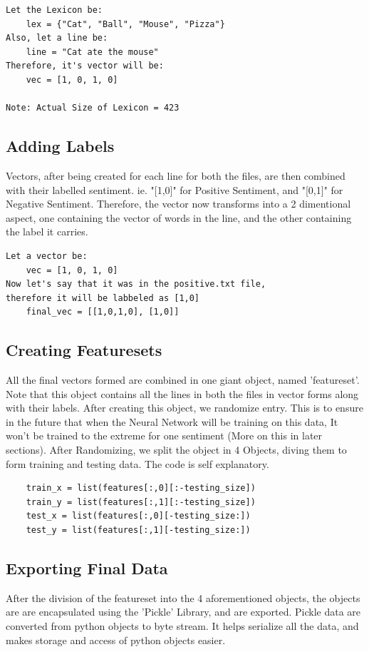 \begin{verbatim}
Let the Lexicon be:
    lex = {"Cat", "Ball", "Mouse", "Pizza"}
Also, let a line be:
    line = "Cat ate the mouse"
Therefore, it's vector will be:
    vec = [1, 0, 1, 0]

Note: Actual Size of Lexicon = 423
\end{verbatim}

\subsection{Adding Labels}
Vectors, after being created for each line for both the files, are then combined with their labelled sentiment. ie. "[1,0]" for Positive Sentiment, and "[0,1]" for Negative Sentiment.
Therefore, the vector now transforms into a 2 dimentional aspect, one containing the vector of words in the line, and the other containing the label it carries.

\begin{verbatim}
Let a vector be:
    vec = [1, 0, 1, 0]
Now let's say that it was in the positive.txt file, 
therefore it will be labbeled as [1,0]
    final_vec = [[1,0,1,0], [1,0]]
\end{verbatim}

\subsection{Creating Featuresets}
All the final vectors formed are combined in one giant object, named 'featureset'. Note that this object contains all the lines in both the files in vector forms along with their labels.
After creating this object, we randomize entry. This is to ensure in the future that when the Neural Network will be training on this data, It won't be trained to the extreme for one sentiment (More on this in later sections).
After Randomizing, we split the object in 4 Objects, diving them to form training and testing data. The code is self explanatory.

\begin{verbatim}
    train_x = list(features[:,0][:-testing_size])
    train_y = list(features[:,1][:-testing_size])
    test_x = list(features[:,0][-testing_size:])
    test_y = list(features[:,1][-testing_size:])
\end{verbatim}

\subsection{Exporting Final Data}
After the division of the featureset into the 4 aforementioned objects, the objects are are encapsulated using the 'Pickle' Library, and are exported. Pickle data are converted from python objects to byte stream. It helps serialize all the data, and makes storage and access of python objects easier.

